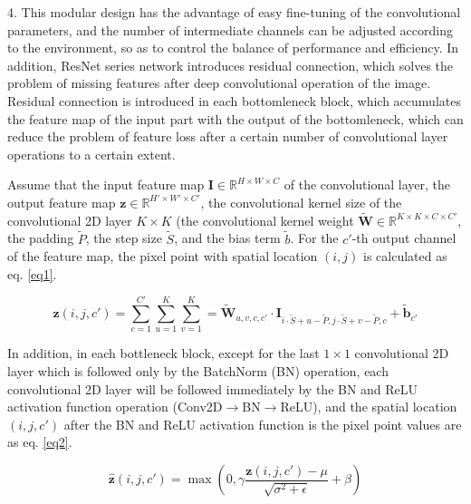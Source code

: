 4. This modular design has the advantage of easy fine-tuning of the convolutional parameters, and the number of intermediate channels can be adjusted according to the environment, so as to control the balance of performance and efficiency. In addition, ResNet series network introduces residual connection, which solves the problem of missing features after deep convolutional operation of the image. Residual connection is introduced in each bottomleneck block, which accumulates the feature map of the input part with the output of the bottomleneck, which can reduce the problem of feature loss after a certain number of convolutional layer operations to a certain extent.

Assume that the input feature map $ \mathbf{I} \in \mathbb{ R }^{ H\times W\times C } $ of the convolutional layer, the output feature map $\boldsymbol{z} \in \mathbb{ R }^{ H'\times W'\times C' }$, the convolutional kernel size of the convolutional 2D layer $K\times K$ (the convolutional kernel weight $ \tilde{\mathbf{W}} \in \mathbb{ R }^{ K\times K\times C\times C' } $, the padding $\tilde{P}$, the step size $\tilde{S}$, and the bias term $\tilde{b}$. For the $c'$-th output channel of the feature map, the pixel point with spatial location $(i,j)$ is calculated as eq. \ref{eq1}.

\begin{equation}
\label{eq1}
  \boldsymbol{z}(i, j, c') = \sum^{C'}_{c=1} \sum^K_{u=1} \sum^K_{v=1} = \tilde{\mathbf{W}}_{u, v, c, c'} \cdot \mathbf{I}_{i\cdot \tilde{S}+u-\tilde{P}, j\cdot \tilde{S}+v - \tilde{P}, c} + \tilde{\mathbf{b}}_{c'}
\end{equation}

In addition, in each bottleneck block, except for the last $1\times 1$ convolutional 2D layer which is followed only by the BatchNorm (BN) \cite{16} operation, each convolutional 2D layer will be followed immediately by the BN and ReLU activation function \cite{29} operation (Conv2D$\to$BN$\to$ReLU), and the spatial location $(i,j,c')$ after the BN and ReLU activation function is the pixel point values are as eq. \ref{eq2}.

\begin{equation}
\label{eq2}
  \hat{\boldsymbol{z}}(i, j, c') = \max \left( 0, \gamma \frac{\boldsymbol{z}(i, j, c') - \mu}{\sqrt{\sigma^2+\epsilon}}+\beta \right)
\end{equation}

